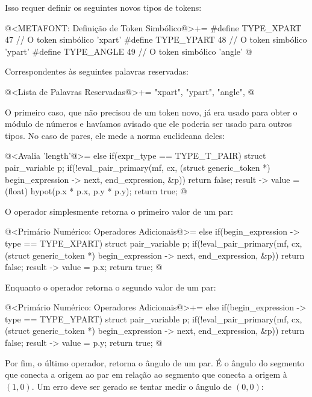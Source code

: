 Isso requer definir os seguintes novos tipos de tokens:

\iniciocodigo
@<METAFONT: Definição de Token Simbólico@>+=
#define TYPE_XPART  47 // O token simbólico 'xpart'
#define TYPE_YPART  48 // O token simbólico 'ypart'
#define TYPE_ANGLE  49 // O token simbólico 'angle'
@
\fimcodigo

Correspondentes às seguintes palavras reservadas:

\iniciocodigo
@<Lista de Palavras Reservadas@>+=
"xpart", "ypart", "angle",
@
\fimcodigo

O primeiro caso, que não precisou de um token
novo,  já era usado para obter o módulo de números
e havíamos avisado que ele poderia ser usado para outros tipos. No
caso de pares, ele mede a norma euclideana deles:

\iniciocodigo
@<Avalia 'length'@>=
else if(expr_type == TYPE_T_PAIR){
  struct pair_variable p;
  if(!eval_pair_primary(mf, cx, (struct generic_token *)
                                begin_expression -> next, end_expression,
                                &p))
    return false;
  result -> value = (float) hypot(p.x * p.x, p.y * p.y);
  return true;
}
@
\fimcodigo

O operador  simplesmente retorna o primeiro valor de
um par:

\iniciocodigo
@<Primário Numérico: Operadores Adicionais@>=
else if(begin_expression -> type == TYPE_XPART){
  struct pair_variable p;
  if(!eval_pair_primary(mf, cx, (struct generic_token *)
                                begin_expression -> next, end_expression,
                                &p))
    return false;
  result -> value = p.x;
  return true;
}
@
\fimcodigo

Enquanto o operador  retorna o segundo valor de um
par:

\iniciocodigo
@<Primário Numérico: Operadores Adicionais@>+=
else if(begin_expression -> type == TYPE_YPART){
  struct pair_variable p;
  if(!eval_pair_primary(mf, cx, (struct generic_token *)
                                begin_expression -> next, end_expression,
                                &p))
    return false;
  result -> value = p.y;
  return true;
}
@
\fimcodigo

Por fim, o último operador,  retorna o ângulo de um
par. É o ângulo do segmento que conecta a origem ao par em relação ao
segmento que conecta a origem à $(1,0)$. Um erro deve ser gerado se
tentar medir o ângulo de $(0,0)$:

